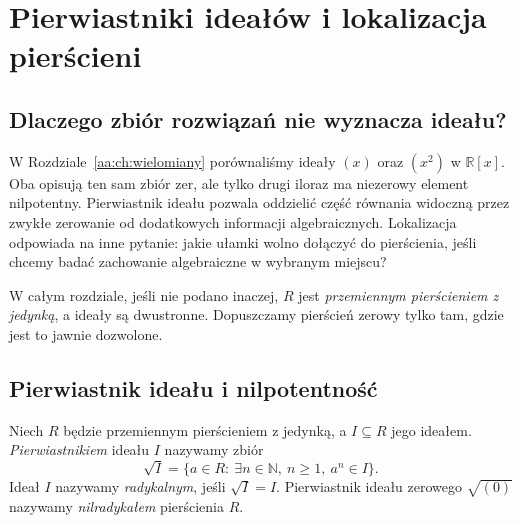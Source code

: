 \chapter{Pierwiastniki ideałów i lokalizacja pierścieni}
\label{aa:ch:lokalizacja}

\providecommand{\atlasref}[2]{#2}
\setlength{\parskip}{2pt}

\section{Dlaczego zbiór rozwiązań nie wyznacza ideału?}
W Rozdziale~\ref{aa:ch:wielomiany} porównaliśmy ideały
$(x)$ oraz $(x^2)$ w $\mathbb R[x]$. Oba opisują ten sam
zbiór zer, ale tylko drugi iloraz ma niezerowy element
nilpotentny. Pierwiastnik ideału pozwala oddzielić część
równania widoczną przez zwykłe zerowanie od dodatkowych
informacji algebraicznych. Lokalizacja odpowiada na inne
pytanie: jakie ułamki wolno dołączyć do pierścienia, jeśli
chcemy badać zachowanie algebraiczne w wybranym miejscu?

W całym rozdziale, jeśli nie podano inaczej, $R$ jest
\emph{przemiennym pierścieniem z jedynką}, a ideały
są dwustronne. Dopuszczamy pierścień zerowy tylko tam,
gdzie jest to jawnie dozwolone.

\section{Pierwiastnik ideału i nilpotentność}
\begin{definicja}
\label{aa:def:ideal-radical}
Niech $R$ będzie przemiennym pierścieniem z jedynką,
a $I\subseteq R$ jego ideałem. \emph{Pierwiastnikiem}
ideału $I$ nazywamy zbiór
\[
 \sqrt I=\{a\in R:\ \exists n\in\mathbb N,\ n\ge1,\ a^n\in I\}.
\]
Ideał $I$ nazywamy \emph{radykalnym}, jeśli $\sqrt I=I$.
Pierwiastnik ideału zerowego $\sqrt{(0)}$ nazywamy
\emph{nilradykałem} pierścienia $R$.
\end{definicja}

